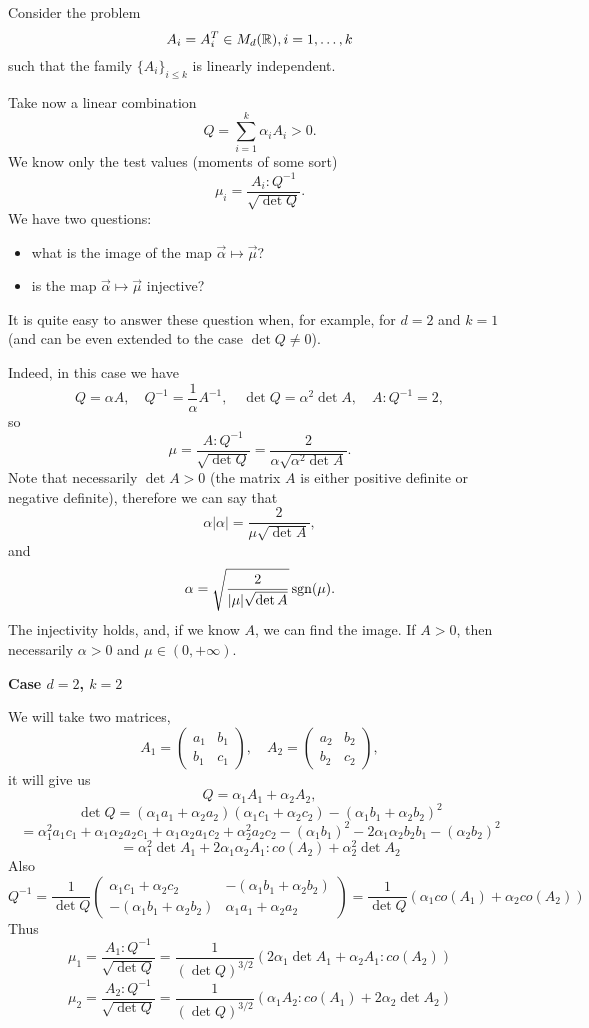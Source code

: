 Consider the problem
\[
    A_i=A_i^T\in M_d({\mathbb R}), i=1,\dots,k
\]
such that the family $\{A_i\}_{i\le k}$ is linearly independent.

Take now   a linear combination
\[
    Q = \sum_{i=1}^k \alpha_i A_i>0.
\]
We know only the test values (moments of some sort) 
\[
    \mu_i = \frac{A_i:Q^{-1}}{\sqrt{\det Q}}.
\]
We have two questions:
\begin{itemize}
    \item what is the image of the map $\vec \alpha\mapsto \vec \mu$?
    \item is the map $\vec \alpha\mapsto \vec \mu$ injective?
\end{itemize}
It is quite easy to answer these question when, for example, for $d=2$ and $k=1$ (and can be even extended to the case $\det Q\ne 0$).

Indeed, in this case we have
\[
    Q= \alpha A, \quad Q^{-1} = \frac{1}{\alpha}A^{-1},\quad \det Q = \alpha^2\det A, \quad A:Q^{-1}=2,
\]
so
\[
    \mu = \frac{A:Q^{-1}}{\sqrt{\det Q}}=\frac{2}{\alpha\sqrt{\alpha^2\det A }}.
\]
Note that necessarily $\det A>0$ (the matrix $A$ is either positive definite or negative definite), therefore we can say that
\[
    \alpha |\alpha| =  \frac{2}{\mu\sqrt{\det A}},
\]
and
\[
    \alpha   = \sqrt{\frac{2}{|\mu|\sqrt{\det A}}}\operatorname{sgn}(\mu).
\]
The injectivity holds, and, if we know $A$, we can find the image. If $A>0$, then necessarily $\alpha>0$ and $\mu\in (0,+\infty)$.


\textbf{Case $d=2$, $k=2$}

We will take two matrices,
\[
    A_1=\begin{pmatrix}
        a_1&b_1\\b_1&c_1
    \end{pmatrix},\quad
    A_2=\begin{pmatrix}
        a_2&b_2\\b_2&c_2
    \end{pmatrix},
\] 
it will give us
\[Q=\alpha_1 A_1+\alpha_2 A_2,\]
\[\det Q = (\alpha_1 a_1+\alpha_2 a_2)(\alpha_1 c_1+\alpha_2 c_2)-(\alpha_1 b_1+\alpha_2 b_2)^2\]
\[  =  \alpha_1^2 a_1  c_1+\alpha_1\alpha_2 a_2 c_1+\alpha_1 \alpha_2 a_1 c_2+\alpha_2^2 a_2 c_2  - (\alpha_1 b_1)^2  -2\alpha_1\alpha_2 b_2 b_1 - (\alpha_2 b_2)^2 \]
\[
    =\alpha_1^2\det A_1 +2 \alpha_1 \alpha_2 A_1:co(A_2) + \alpha_2^2\det A_2
\]
Also
\[
    Q^{-1}=\frac{1}{\det Q}
    \begin{pmatrix}
        \alpha_1 c_1+\alpha_2 c_2&-(\alpha_1 b_1+\alpha_2 b_2)\\
        -(\alpha_1 b_1+\alpha_2 b_2)&\alpha_1 a_1+\alpha_2 a_2
    \end{pmatrix}
    =
    \frac{1}{\det Q}\left( \alpha_1 co(A_1)+ \alpha_2 co(A_2)\right)
\]
Thus
\[
    \mu_1 = \frac{A_1:Q^{-1}}{\sqrt{\det Q}}=\frac{1}{(\det Q)^{3/2}}\left( 2\alpha_1 \det A_1+ \alpha_2 A_1:co(A_2)\right)
\]
\[
    \mu_2 =\frac{A_2:Q^{-1}}{\sqrt{\det Q}}=\frac{1}{(\det Q)^{3/2}}\left(\alpha_1 A_2:co(A_1) + 2\alpha_2 \det A_2  \right)
\]
